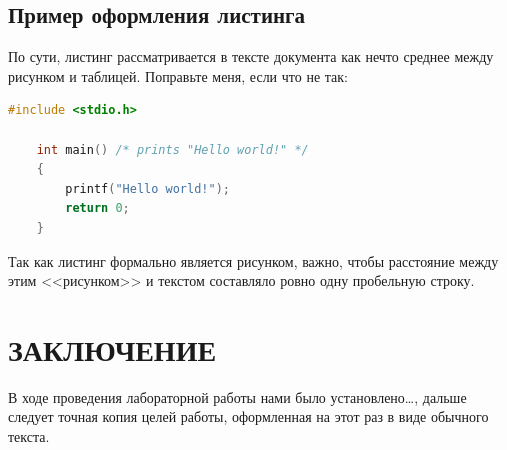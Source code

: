 \documentclass[a4paper,hidelinks,14pt]{extarticle}
\begin{document}
\newpage

\subsection{Пример оформления листинга}

По сути, листинг рассматривается в тексте документа как нечто среднее между рисунком и таблицей. Поправьте меня, если что не так: 
\begin{lstlisting}[language=c,caption=Исходный код какой-то программы на C]
	#include <stdio.h>
	
	int main() /* prints "Hello world!" */
	{ 
		printf("Hello world!"); 
		return 0;
	}
\end{lstlisting}
Так как листинг формально является рисунком, важно, чтобы расстояние
между этим <<рисунком>> и текстом составляло ровно одну пробельную строку.


\section*{ЗАКЛЮЧЕНИЕ}

В ходе проведения лабораторной работы нами было установлено\dots,
дальше следует точная копия целей работы, оформленная на этот раз в 
виде обычного текста.

\newpage



\end{document}
